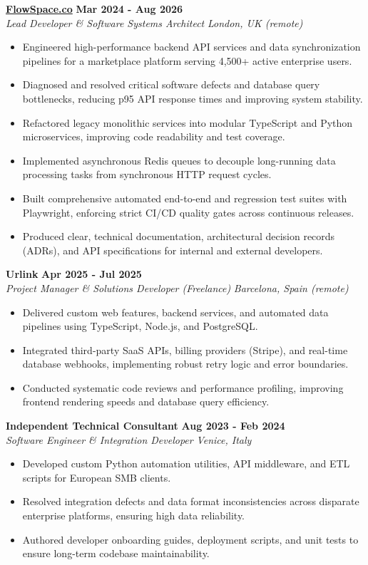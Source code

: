 \documentclass[10pt,a4paper]{article}
\newcommand{\role}[4]{%
  \textbf{#1} \hfill \textbf{#2}\\[1pt]%
  \textit{#3} \hfill \textit{#4}\\[2pt]%
}
\begin{document}
\role{\href{https://flowspace.co}{FlowSpace.co}}{Mar 2024 - Aug 2026}{Lead Developer \& Software Systems Architect}{London, UK (remote)}
\begin{itemize}
  \item Engineered high-performance backend API services and data synchronization pipelines for a marketplace platform serving 4,500+ active enterprise users.
  \item Diagnosed and resolved critical software defects and database query bottlenecks, reducing p95 API response times and improving system stability.
  \item Refactored legacy monolithic services into modular TypeScript and Python microservices, improving code readability and test coverage.
  \item Implemented asynchronous Redis queues to decouple long-running data processing tasks from synchronous HTTP request cycles.
  \item Built comprehensive automated end-to-end and regression test suites with Playwright, enforcing strict CI/CD quality gates across continuous releases.
  \item Produced clear, technical documentation, architectural decision records (ADRs), and API specifications for internal and external developers.
\end{itemize}

\role{Urlink}{Apr 2025 - Jul 2025}{Project Manager \& Solutions Developer (Freelance)}{Barcelona, Spain (remote)}
\begin{itemize}
  \item Delivered custom web features, backend services, and automated data pipelines using TypeScript, Node.js, and PostgreSQL.
  \item Integrated third-party SaaS APIs, billing providers (Stripe), and real-time database webhooks, implementing robust retry logic and error boundaries.
  \item Conducted systematic code reviews and performance profiling, improving frontend rendering speeds and database query efficiency.
\end{itemize}

\role{Independent Technical Consultant}{Aug 2023 - Feb 2024}{Software Engineer \& Integration Developer}{Venice, Italy}
\begin{itemize}
  \item Developed custom Python automation utilities, API middleware, and ETL scripts for European SMB clients.
  \item Resolved integration defects and data format inconsistencies across disparate enterprise platforms, ensuring high data reliability.
  \item Authored developer onboarding guides, deployment scripts, and unit tests to ensure long-term codebase maintainability.
\end{itemize}
\end{document}
